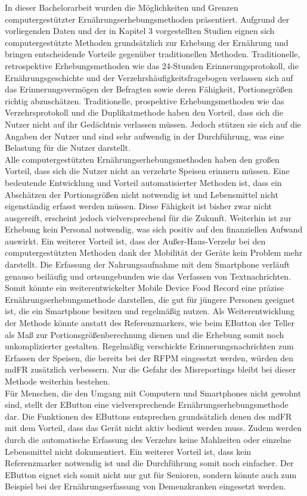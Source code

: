In dieser Bachelorarbeit wurden die Möglichkeiten und Grenzen computergestützter Ernährungserhebungsmethoden präsentiert. Aufgrund der vorliegenden Daten und der in Kapitel 3 vorgestellten Studien eignen sich computergestützte Methoden grundsätzlich zur Erhebung der Ernährung und bringen entscheidende Vorteile gegenüber traditionellen Methoden. Traditionelle, retrospektive Erhebungsmethoden wie das 24-Stunden Erinnerungsprotokoll, die Ernährungsgeschichte und der Verzehrshäufigkeitsfragebogen verlassen sich auf das Erinnerungsvermögen der Befragten sowie deren Fähigkeit, Portionsgrößen richtig abzuschätzen. 
Traditionelle, prospektive Erhebungsmethoden wie das Verzehrsprotokoll und die Duplikatmethode haben den Vorteil, dass sich die Nutzer nicht auf ihr Gedächtnis verlassen müssen. Jedoch stützen sie sich auf die Angaben der Nutzer und sind sehr aufwendig in der Durchführung, was eine Belastung für die Nutzer darstellt. \\
Alle computergestützten Ernährungserhebungsmethoden haben den großen Vorteil, dass sich die Nutzer nicht an verzehrte Speisen erinnern müssen. Eine bedeutende Entwicklung und Vorteil automatisierter Methoden ist, dass ein Abschätzen der Portionsgrößen nicht notwendig ist und Lebensmittel nicht eigenständig erfasst werden müssen. Diese Fähigkeit ist bisher zwar nicht ausgereift, erscheint jedoch vielversprechend für die Zukunft. Weiterhin ist zur Erhebung kein Personal notwendig, was sich positiv auf den finanziellen Aufwand auswirkt. Ein weiterer Vorteil ist, dass der Außer-Haus-Verzehr bei den computergestützten Methoden dank der Mobilität der Geräte kein Problem mehr darstellt. Die Erfassung der Nahrungsaufnahme mit dem Smartphone verläuft genauso beiläufig und ortsungebunden wie das Verfassen von Textnachrichten. Somit könnte ein weiterentwickelter Mobile Device Food Record eine präzise Ernährungserhebungsmethode darstellen, die gut für jüngere Personen geeignet ist, die ein Smartphone besitzen und regelmäßig nutzen. Als Weiterentwicklung der Methode könnte anstatt des Referenzmarkers, wie beim EButton der Teller als Maß zur Portionsgrößenberechnung dienen und die Erhebung somit noch unkomplizierter gestalten. Regelmäßig verschickte Erinnerungsnachrichten zum Erfassen der Speisen, die bereits bei der RFPM eingesetzt werden, würden den mdFR zusätzlich verbessern. Nur die Gefahr des Misreportings bleibt bei dieser Methode weiterhin bestehen. \\
Für Menschen, die den Umgang mit Computern und Smartphones nicht gewohnt sind, stellt der EButton eine vielversprechende Ernährungserhebungsmethode dar. Die Funktionen des EButtons entsprechen grundsätzlich denen des mdFR mit dem Vorteil, dass das Gerät nicht aktiv bedient werden muss. Zudem werden durch die automatische Erfassung des Verzehrs keine Mahlzeiten oder einzelne Lebensmittel nicht dokumentiert. Ein weiterer Vorteil ist, dass kein Referenzmarker notwendig ist und die Durchführung somit noch einfacher. Der EButton eignet sich somit nicht nur gut für Senioren, sondern könnte auch zum Beispiel bei der Ernährungserfassung von Demenzkranken eingesetzt werden. \\
